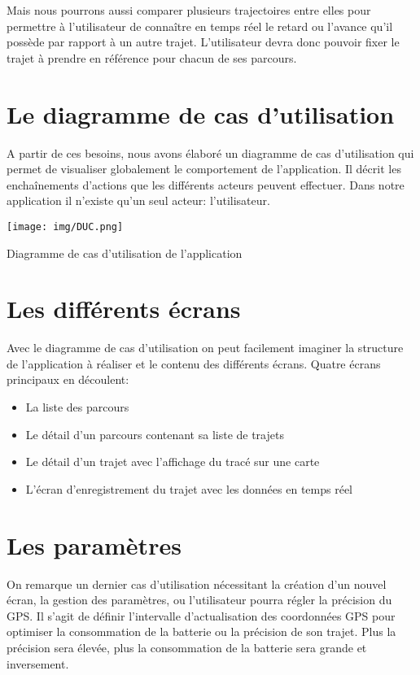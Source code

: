 Mais nous pourrons aussi comparer plusieurs trajectoires entre elles pour permettre à l'utilisateur de connaître en temps réel le retard ou l'avance qu'il possède par rapport à un autre trajet. L'utilisateur devra donc pouvoir fixer le trajet à prendre en référence pour chacun de ses parcours. 

\section{Le diagramme de cas d'utilisation}
A partir de ces besoins, nous avons élaboré un diagramme de cas d'utilisation qui permet de visualiser globalement le comportement de l'application. Il décrit les enchaînements d'actions que les différents acteurs peuvent effectuer. Dans notre application il n'existe qu'un seul acteur: l'utilisateur.

\begin{img}
  \texttt{[image: img/DUC.png]}
  \caption{Diagramme de cas d'utilisation de l'application}
\end{img}

\section{Les différents écrans}
Avec le diagramme de cas d'utilisation on peut facilement imaginer la structure de l'application à réaliser et le contenu des différents écrans. Quatre écrans principaux en découlent:\bigskip

\begin{itemize}
  \item La liste des parcours
  \item Le détail d'un parcours contenant sa liste de trajets
  \item Le détail d'un trajet avec l'affichage du tracé sur une carte
  \item L'écran d'enregistrement du trajet avec les données en temps réel 
\end{itemize}\bigskip

\section{Les paramètres}
On remarque un dernier cas d'utilisation nécessitant la création d'un nouvel écran, la gestion des paramètres, ou l'utilisateur pourra régler la précision du GPS. Il s'agit de définir l'intervalle d'actualisation des coordonnées GPS pour optimiser la consommation de la batterie ou la précision de son trajet. Plus la précision sera élevée, plus la consommation de la batterie sera grande et inversement.
 